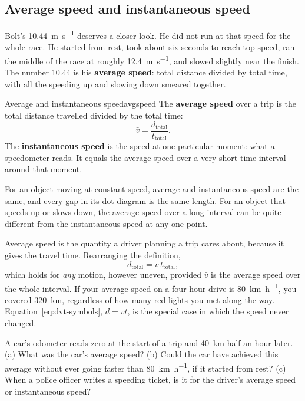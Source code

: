 \documentclass[11pt,twoside,openany]{book}
\newcounter{check}[chapter]
\begin{document}
\subsection{Average speed and instantaneous speed}

Bolt's \SI{10.44}{\metre\per\second} deserves a closer look. He did not run at that speed for the whole race. He started from rest, took about six seconds to reach top speed, ran the middle of the race at roughly \SI{12.4}{\metre\per\second}, and slowed slightly near the finish. The number \num{10.44} is his \textbf{average speed}: total distance divided by total time, with all the speeding up and slowing down smeared together.

\begin{definition}{Average and instantaneous speed}{avgspeed}
The \textbf{average speed} over a trip is the total distance travelled divided by the total time:
\[
\bar v = \frac{d_{\text{total}}}{t_{\text{total}}}.
\]
The \textbf{instantaneous speed} is the speed at one particular moment: what a speedometer reads. It equals the average speed over a very short time interval around that moment.
\end{definition}

For an object moving at constant speed, average and instantaneous speed are the same, and every gap in its dot diagram is the same length. For an object that speeds up or slows down, the average speed over a long interval can be quite different from the instantaneous speed at any one point.

Average speed is the quantity a driver planning a trip cares about, because it gives the travel time. Rearranging the definition,
\[
d_{\text{total}} = \bar v\, t_{\text{total}},
\]
which holds for \emph{any} motion, however uneven, provided $\bar v$ is the average speed over the whole interval. If your average speed on a four-hour drive is \SI{80}{\kilo\metre\per\hour}, you covered \SI{320}{\kilo\metre}, regardless of how many red lights you met along the way. Equation~\eqref{eq:dvt-symbols}, $d = vt$, is the special case in which the speed never changed.

\begin{checkbox}
A car's odometer reads zero at the start of a trip and \SI{40}{\kilo\metre} half an hour later. (a) What was the car's average speed? (b) Could the car have achieved this average without ever going faster than \SI{80}{\kilo\metre\per\hour}, if it started from rest? (c) When a police officer writes a speeding ticket, is it for the driver's average speed or instantaneous speed?
\end{checkbox}
\end{document}
